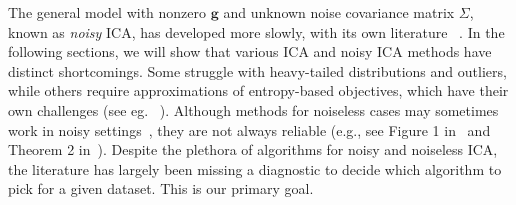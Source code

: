 \documentclass[letterpaper]{article}
\newcommand{\bg}{\pmb{g}}
\newcommand{\bk}{\color{black}}
\begin{document}
The general model with nonzero $\bg$ and unknown noise covariance matrix $\Sigma$, known as \textit{noisy} ICA, has developed more slowly, with its own literature ~\cite{arora2012Quasi,NIPS2013_4d2e7bd3,NIPS2015_89f03f7d,Ilmonen2011SemiparametricallyEI,ilmonen2011semiparametrically, rohe2020vintage}. In the following sections, we will show that various ICA and noisy ICA methods have distinct shortcomings. Some struggle with heavy-tailed distributions and outliers, while others require approximations of entropy-based objectives, which have their own challenges (see eg. ~\cite{issoglio2021estimation}). Although methods for noiseless cases may sometimes work in noisy settings~\cite{NIPS2015_89f03f7d}, they are not always reliable (e.g., see Figure 1 in~\cite{NIPS2015_89f03f7d} and Theorem 2 in~\cite{chen2005ICA}). Despite the plethora of algorithms for noisy and noiseless ICA, the literature has largely been missing a diagnostic to decide which algorithm to pick for a given dataset. This is our primary goal.

\end{document}
